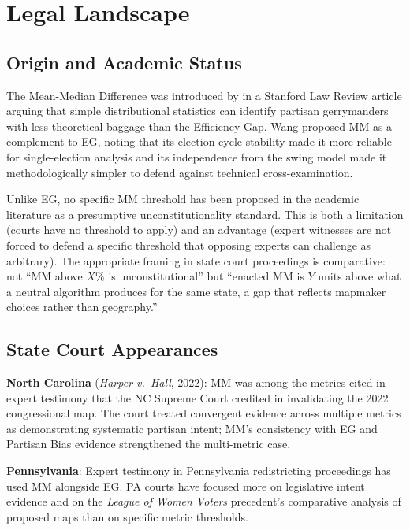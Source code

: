 \section{Legal Landscape}
\label{sec:legal}

\subsection{Origin and Academic Status}

The Mean-Median Difference was introduced by \citet{wang2016} in a Stanford Law Review
article arguing that simple distributional statistics can identify partisan gerrymanders
with less theoretical baggage than the Efficiency Gap. Wang proposed MM as a complement
to EG, noting that its election-cycle stability made it more reliable for single-election
analysis and its independence from the swing model made it methodologically simpler to
defend against technical cross-examination.

Unlike EG, no specific MM threshold has been proposed in the academic literature as
a presumptive unconstitutionality standard. This is both a limitation (courts have
no threshold to apply) and an advantage (expert witnesses are not forced to defend
a specific threshold that opposing experts can challenge as arbitrary). The appropriate
framing in state court proceedings is comparative: not ``MM above $X\%$ is unconstitutional''
but ``enacted MM is $Y$ units above what a neutral algorithm produces for the same state,
a gap that reflects mapmaker choices rather than geography.''

\subsection{State Court Appearances}

\textbf{North Carolina} (\textit{Harper v.\ Hall}, 2022): MM was among the metrics
cited in expert testimony that the NC Supreme Court credited in invalidating the
2022 congressional map. The court treated convergent evidence across multiple metrics
as demonstrating systematic partisan intent; MM's consistency with EG and Partisan
Bias evidence strengthened the multi-metric case.

\textbf{Pennsylvania}: Expert testimony in Pennsylvania redistricting proceedings
has used MM alongside EG. PA courts have focused more on legislative intent evidence
and on the \textit{League of Women Voters} precedent's comparative analysis of
proposed maps than on specific metric thresholds.

